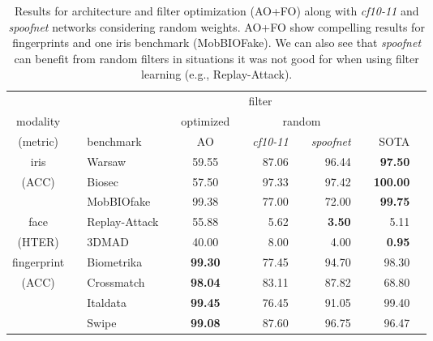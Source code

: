 \begin{table}
\begin{center}
\caption{Results for architecture and filter optimization (AO+FO) along with \emph{cf10-11} and \emph{spoofnet} networks considering random weights.
AO+FO show compelling results for fingerprints and one iris benchmark (MobBIOFake). We can also see that \emph{spoofnet} can benefit from random filters in situations it was not good for when using filter learning (e.g., Replay-Attack).}
\label{tab:interplay}
\begin{tabular}{c@{ }c@{ }l@{ }r@{ }c@{ }r@{ }r@{ }r@{ }r@{ }r@{ }r@{ }c}
\hline
         & \hspace{1em} && \multicolumn{6}{c}{filter}\\ \cline{4-9}
modality & \hspace{1em} &&& optimized && \multicolumn{3}{c}{random} \\ \cline{5-5} \cline{7-9}
(metric) && benchmark \hspace{1em} && AO && \textit{cf10-11} && \textit{spoofnet} && SOTA & \\
\hline
iris && Warsaw        &&                59.55  && 87.06 &&          96.44  && \textbf{ 97.50} \\
(ACC)&& Biosec        &&                57.50  && 97.33 &&          97.42  && \textbf{100.00} \\
     && MobBIOfake    &&                99.38  && 77.00 &&          72.00  &&  \textbf{ 99.75} \\
\hline
face && Replay-Attack &&                55.88  &&  5.62 &&  \textbf{ 3.50} &&           5.11 \\
(HTER) && 3DMAD       &&                40.00  &&  8.00 &&           4.00  &&  \textbf{ 0.95} \\ 
\hline
fingerprint &&Biometrika     && \textbf{99.30}  && 77.45 &&          94.70  &&           98.30\\
(ACC)     &&Crossmatch       && \textbf{98.04}  && 83.11 &&          87.82  &&           68.80\\
     &&Italdata              && \textbf{99.45}  && 76.45 &&          91.05  &&           99.40\\
     &&Swipe                 && \textbf{99.08}  && 87.60 &&          96.75  &&           96.47\\
\hline
\end{tabular}
\end{center}
\end{table}

